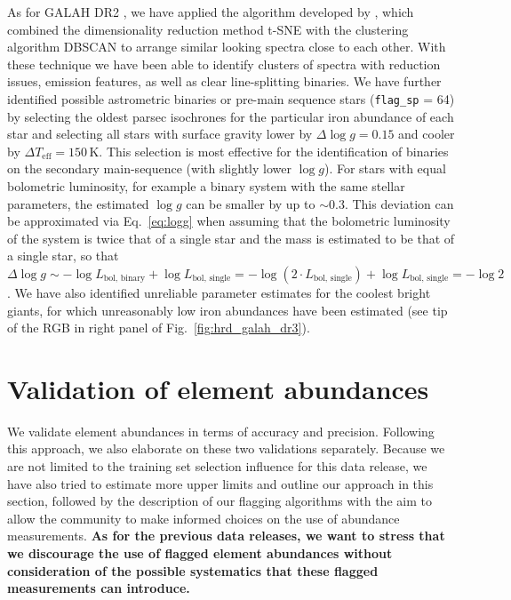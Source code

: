 \documentclass[fleqn,usenatbib,useAMS]{mnras}
\begin{document}
As for GALAH DR2 \citep{Buder2018}, we have applied the algorithm developed by \citet{Traven2017}, which combined the dimensionality reduction method t-SNE \citep{vanderMaaten2008} with the clustering algorithm \textsc{DBSCAN} \citep{Ester1996} to arrange similar looking spectra close to each other. With these technique we have been able to identify clusters of spectra with reduction issues, emission features, as well as clear line-splitting binaries. We have further identified possible astrometric binaries or pre-main sequence stars (\texttt{flag\_sp} = 64) by selecting the oldest {\sc parsec} isochrones for the particular iron abundance of each star and selecting all stars with surface gravity lower by $\Delta \log g = 0.15$ and cooler by $\Delta T_\text{eff} = 150\,\mathrm{K}$. This selection is most effective for the identification of binaries on the secondary main-sequence (with slightly lower $\log g$). For stars with equal bolometric luminosity, for example a binary system with the same stellar parameters, the estimated $\log g$ can be smaller by up to $\sim 0.3$. This deviation can be approximated via Eq.~\ref{eq:logg} when assuming that the bolometric luminosity of the system is twice that of a single star and the mass is estimated to be that of a single star, so that $\Delta \log g \sim - \log L_\text{bol, binary} + \log L_\text{bol, single} = - \log \left( 2 \cdot L_\text{bol, single} \right) + \log L_\text{bol, single} = - \log 2 $. We have also identified unreliable parameter estimates for the coolest bright giants, for which unreasonably low iron abundances have been estimated (see tip of the RGB in right panel of Fig.~\ref{fig:hrd_galah_dr3}).

\section{Validation of element abundances} \label{sec:validation_ab}

We validate element abundances in terms of accuracy and precision. Following this approach, we also elaborate on these two validations separately. Because we are not limited to the training set selection influence for this data release, we have also tried to estimate more upper limits and outline our approach in this section, followed by the description of our flagging algorithms with the aim to allow the community to make informed choices on the use of abundance measurements. \textbf{As for the previous data releases, we want to stress that we discourage the use of flagged element abundances without consideration of the possible systematics that these flagged measurements can introduce.}
\end{document}
